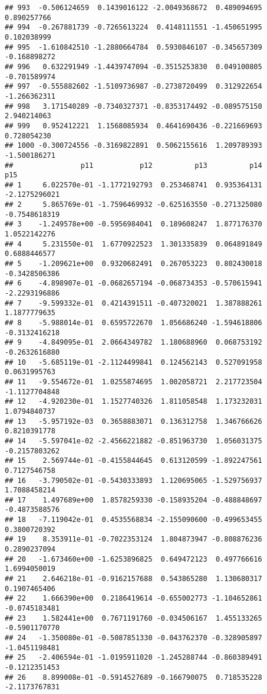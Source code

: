 \documentclass[
]{article}
\begin{document}
\begin{verbatim}
## 993  -0.506124659  0.1439016122 -2.0049368672  0.489094695  0.890257766
## 994  -0.267881739 -0.7265613224  0.4148111551 -1.450651995  0.102038999
## 995  -1.610842510 -1.2880664784  0.5930846107 -0.345657309 -0.168898272
## 996   0.632291949 -1.4439747094 -0.3515253830  0.049100805 -0.701589974
## 997  -0.555882602 -1.5109736987 -0.2738720499  0.312922654 -1.266362311
## 998   3.171540289 -0.7340327371 -0.8353174492 -0.089575150  2.940214063
## 999   0.952412221  1.1568085934  0.4641690436 -0.221669693  0.728054230
## 1000 -0.300724556 -0.3169822891  0.5062155616  1.209789393 -1.500186271
##                p11           p12          p13          p14           p15
## 1     6.022570e-01 -1.1772192793  0.253468741  0.935364131 -2.1275296021
## 2     5.865769e-01 -1.7596469932 -0.625163550 -0.271325080 -0.7548618319
## 3    -1.249578e+00 -0.5956984041  0.189608247  1.877176370  1.0522142276
## 4     5.231550e-01  1.6770922523  1.301335839  0.064891849  0.6888446577
## 5    -1.209621e+00  0.9320682491  0.267053223  0.802430018 -0.3428506386
## 6    -4.898907e-01 -0.0682657194 -0.068734353 -0.570615941 -2.2293196886
## 7    -9.599332e-01  0.4214391511 -0.407320021  1.387888261  1.1877779635
## 8    -5.988014e-01  0.6595722670  1.056686240 -1.594618806 -0.3132416218
## 9    -4.849095e-01  2.0664349782  1.180688960  0.068753192 -0.2632616880
## 10   -5.685119e-01 -2.1124499841  0.124562143  0.527091958  0.0631995763
## 11   -9.554672e-01  1.0255874695  1.002058721  2.217723504 -1.1127704848
## 12   -4.920230e-01  1.1527740326  1.811058548  1.173232031  1.0794840737
## 13   -5.957192e-03  0.3658883071  0.136312758  1.346766626  0.8210391778
## 14   -5.597041e-02 -2.4566221882 -0.851963730  1.056031375 -0.2157803262
## 15    2.569744e-01 -0.4155844645  0.613120599 -1.892247561  0.7127546758
## 16   -3.790502e-01 -0.5430333893  1.120695065 -1.529756937  1.7088458214
## 17    1.497689e+00  1.8578259330 -0.158935204 -0.488848697 -0.4873588576
## 18   -7.119042e-01  0.4535568834 -2.155090600 -0.499653455  0.3800720392
## 19    8.353911e-01 -0.7022353124  1.804873947 -0.808876236  0.2890237094
## 20   -1.673460e+00 -1.6253896825  0.649472123  0.497766616  1.6994050019
## 21    2.646218e-01 -0.9162157688  0.543865280  1.130680317  0.1907465406
## 22    1.666390e+00  0.2186419614 -0.655002773 -1.104652861 -0.0745183481
## 23    1.582441e+00  0.7671191760 -0.034506167  1.455133265 -0.5901170770
## 24   -1.350080e-01 -0.5087851330 -0.043762370 -0.328905897 -1.0451198481
## 25   -2.406594e-01 -1.0195911020 -1.245288744 -0.860389491 -0.1212351453
## 26    8.899008e-01 -0.5914527689 -0.166790075  0.718535228 -2.1173767831

\end{verbatim}
\end{document}

